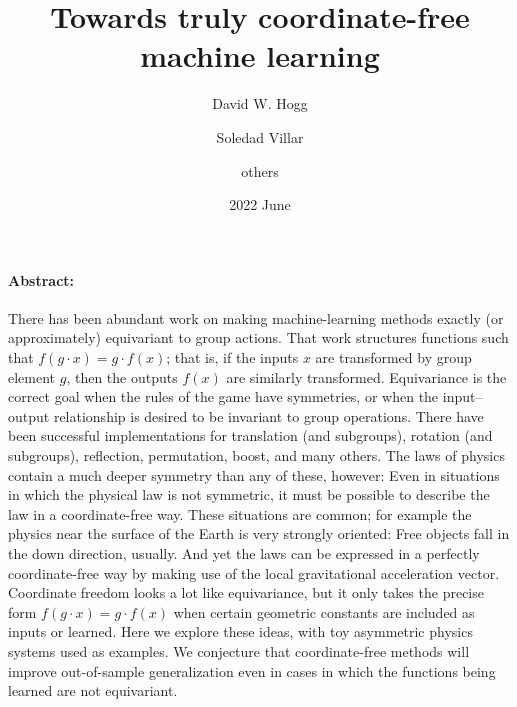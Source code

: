 \documentclass[12pt]{article}
\title{\bfseries%
  Towards truly coordinate-free machine learning}
\author{David W. Hogg}
\author{Soledad Villar}
\author{others}
\date{2022 June}
\begin{document}
\maketitle\thispagestyle{empty}

\paragraph{Abstract:}
There has been abundant work on making machine-learning methods exactly (or approximately) equivariant to group actions.
That work structures functions such that $f(g\cdot x) = g\cdot f(x)$; that is, if the inputs $x$ are transformed by group element $g$, then the outputs $f(x)$ are similarly transformed.
Equivariance is the correct goal when the rules of the game have symmetries, or when the input--output relationship is desired to be invariant to group operations.
There have been successful implementations for translation (and subgroups), rotation (and subgroups), reflection, permutation, boost, and many others.
The laws of physics contain a much deeper symmetry than any of these, however:
Even in situations in which the physical law is not symmetric, it must be possible to describe the law in a coordinate-free way.
These situations are common; for example the physics near the surface of the Earth is very strongly oriented:
Free objects fall in the down direction, usually.
And yet the laws can be expressed in a perfectly coordinate-free way by making use of the local gravitational acceleration vector.
Coordinate freedom looks a lot like equivariance, but it only takes the precise form $f(g\cdot x)=g\cdot f(x)$ when certain geometric constants are included as inputs or learned.
Here we explore these ideas, with toy asymmetric physics systems used as examples.
We conjecture that coordinate-free methods will improve out-of-sample generalization even in cases in which the functions being learned are not equivariant.
\end{document}
